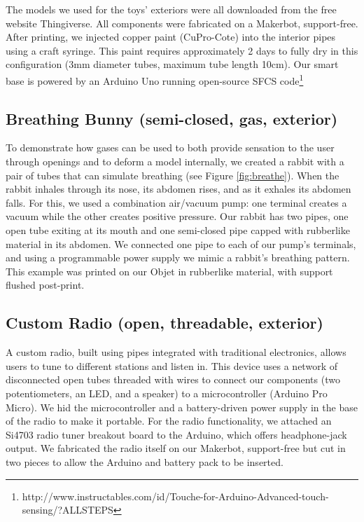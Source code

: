 The models we used for the toys' exteriors were all downloaded from the free website Thingiverse.  All components were fabricated on a Makerbot, support-free.  After printing, we injected copper paint (CuPro-Cote) into the interior pipes using a craft syringe.  This paint requires approximately 2 days to fully dry in this configuration (3mm diameter tubes, maximum tube length 10cm).  Our smart base is powered by an Arduino Uno running open-source SFCS code\footnote{http://www.instructables.com/id/Touche-for-Arduino-Advanced-touch-sensing/?ALLSTEPS}

\subsection{Breathing Bunny (semi-closed, gas, exterior)}

To demonstrate how gases can be used to both provide sensation to the user through openings and to deform a model internally, we created a rabbit with a pair of tubes that can simulate breathing (see Figure \ref{fig:breathe}).  When the rabbit inhales through its nose, its abdomen rises, and as it exhales its abdomen falls.  For this, we used a combination air/vacuum pump: one terminal creates a vacuum while the other creates positive pressure.  Our rabbit has two pipes, one open tube exiting at its mouth and one semi-closed pipe capped with rubberlike material in its abdomen.  We connected one pipe to each of our pump's terminals, and using a programmable power supply we mimic a rabbit's breathing pattern.  This example was printed on our Objet in rubberlike material, with support flushed post-print.

\subsection{Custom Radio (open, threadable, exterior)}

A custom radio, built using pipes integrated with traditional electronics, allows users to tune to different stations and listen in.  This device uses a network of disconnected open tubes threaded with wires to connect our components (two potentiometers, an LED, and a speaker) to a microcontroller (Arduino Pro Micro).  We hid the microcontroller and a battery-driven power supply in the base of the radio to make it portable.  For the radio functionality, we attached an Si4703 radio tuner breakout board to the Arduino, which offers headphone-jack output.  We fabricated the radio itself on our Makerbot, support-free but cut in two pieces to allow the Arduino and battery pack to be inserted.

